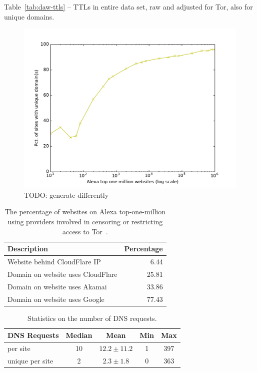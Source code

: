 Table~\ref{tab:daw-ttls} -- TTLs in entire data set, raw and adjusted for Tor,
also for unique domains.

\begin{figure}[t]
	\centering
	\includegraphics[width=\linewidth]{figures/dns-unique-domains.pdf}
	\caption{TODO: generate differently}
	\label{fig:unique-domains}
\end{figure}

\begin{table}[t]
	\centering
	\begin{tabular}{l r}
	\toprule
	\textbf{Description} & \textbf{Percentage} \\
	\midrule
	Website behind CloudFlare IP & 6.44 \\
	Domain on website uses CloudFlare & 25.81 \\
	Domain on website uses Akamai & 33.86 \\
	Domain on website uses Google & 77.43 \\
	\bottomrule
	\end{tabular}
	\caption{The percentage of websites on Alexa top-one-million using providers
	involved in censoring or restricting access to Tor~\cite{Khattak2016a}.}
	\label{tab:dns-censor}
\end{table}

\begin{table}[t]
	\centering
	\begin{tabular}{l c c c c}
	\toprule
	\textbf{DNS Requests} & \textbf{Median} & \textbf{Mean} & \textbf{Min} & \textbf{Max} \\
	\midrule
	per site & 10 & $12.2\pm11.2$ & 1 & 397 \\
	unique per site & 2 & $2.3\pm1.8$ & 0 & 363 \\
	\bottomrule
	\end{tabular}
	\caption{Statistics on the number of DNS requests.}
	\label{tab:daw-unique}
\end{table}


